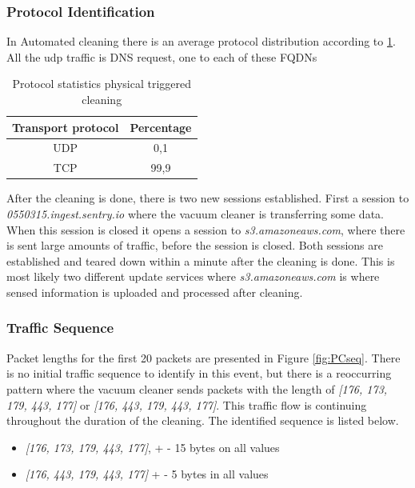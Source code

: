 \subsubsection{Protocol Identification}
In Automated cleaning there is an average protocol distribution according to \ref{tab:pcanalysisdist}. All the udp traffic is DNS request, one to each of these FQDNs

\begin{table}[H]
\centering
\caption{Protocol statistics physical triggered cleaning}
\label{tab:pcanalysisdist}
\begin{tabular}{|c|c|}
\hline
\textbf{Transport protocol} & \textbf{Percentage} \\ \hline
UDP                         & 0,1                 \\ \hline
TCP                         & 99,9                \\ \hline
\end{tabular}
\end{table}

After the cleaning is done, there is two new sessions established. First a session to \textit{0550315.ingest.sentry.io} where the vacuum cleaner is transferring some data. When this session is closed it opens a session to \textit{s3.amazoneaws.com}, where there is sent large amounts of traffic, before the session is closed. Both sessions are established and teared down within a minute after the cleaning is done. This is most likely two different update services where \textit{s3.amazoneaws.com} is where sensed information is uploaded and processed after cleaning.

\subsubsection{Traffic Sequence}
 Packet lengths for the first 20 packets are presented in Figure \ref{fig:PCseq}. There is no initial traffic sequence to identify in this event, but there is a reoccurring pattern where the vacuum cleaner sends packets with the length of \textit{[176, 173, 179, 443, 177]} or \textit{[176, 443, 179, 443, 177]}. This traffic flow is continuing throughout the duration of the cleaning. The identified sequence is listed below.
\begin{itemize}
    \item \textit{[176, 173, 179, 443, 177]}, + - 15 bytes on all values 
    \item \textit{[176, 443, 179, 443, 177]} + - 5 bytes in all values
\end{itemize}

